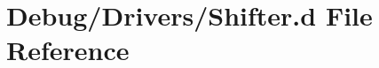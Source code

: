 \hypertarget{_shifter_8d}{}\section{Debug/\+Drivers/\+Shifter.d File Reference}
\label{_shifter_8d}
